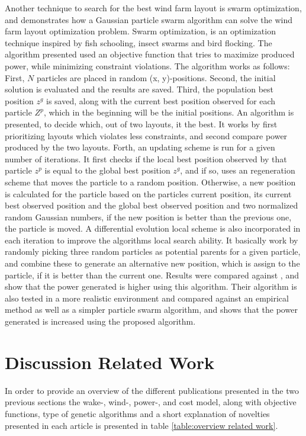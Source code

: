 \noindent Another technique to search for the best wind farm layout is swarm optimization, and \cite{Wan2012} demonstrates how a Gaussian particle swarm algorithm can solve the wind farm layout optimization problem. Swarm optimization, is an optimization technique inspired by fish schooling, insect swarms and bird flocking. The algorithm presented used an objective function that tries to maximize produced power, while minimizing constraint violations. The algorithm works as follows: First, $N$ particles are placed in random (x, y)-positions. Second, the initial solution is evaluated and the results are saved. Third, the population best position $z^g$ is saved, along with the current best position observed for each particle $Z^p$, which in the beginning will be the initial positions. An algorithm is presented, to decide which, out of two layouts, it the best. It works by first prioritizing layouts which violates less constraints, and second compare power produced by the two layouts. Forth, an updating scheme is run for a given number of iterations. It first checks if the local best position observed by that particle $z^p$ is equal to the global best position $z^g$, and if so, uses an regeneration scheme that moves the particle to a random position. Otherwise, a new position is calculated for the particle based on the particles current position, its current best observed position and the global best observed position and two normalized random Gaussian numbers, if the new position is better than the previous one, the particle is moved. A differential evolution local scheme is also incorporated in each iteration to improve the algorithms local search ability. It basically work by randomly picking three random particles as potential parents for a given particle, and combine these to generate an alternative new position, which is assign to the particle, if it is better than the current one. Results were compared against \citep{Grady}, and show that the power generated is higher using this algorithm. Their algorithm is also tested in a more realistic environment and compared against an empirical method as well as a simpler particle swarm algorithm, and shows that the power generated is increased using the proposed algorithm.\\


\section{Discussion Related Work}
In order to provide an overview of the different publications presented in the two previous sections the wake-, wind-, power-, and cost model, along with objective functions, type of genetic algorithms and a short explanation of novelties presented in each article is presented in table \ref{table:overview related work}. \\

